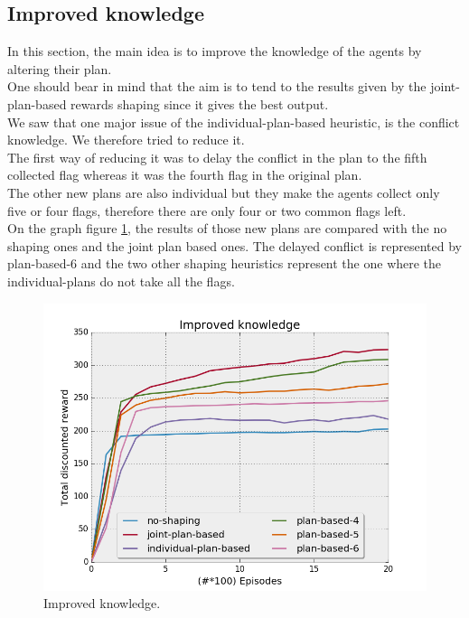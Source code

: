 \documentclass[letterpaper]{article}
\begin{document}
\subsection{Improved knowledge}

In this section, the main idea is to improve the knowledge of the agents by altering their plan.\\
One should bear in mind that the aim is to tend to the results given by the joint-plan-based rewards shaping since it gives the best output.\\
We saw that one major issue of the individual-plan-based heuristic, is the conflict knowledge. We therefore tried to reduce it.\\
The first way of reducing it was to delay the conflict in the plan to the fifth collected flag whereas it was the fourth flag in the original plan.\\
The other new plans are also individual but they make the agents collect only five or four flags, therefore there are only four or two common flags left.\\
On the graph figure \ref{fig:results2}, the results of those new plans are compared with the no shaping ones and the joint plan based ones. The delayed conflict is represented by plan-based-6 and the two other shaping heuristics represent the one where the individual-plans do not take all the flags.

\begin{figure}[h!]
  \includegraphics[width=\linewidth]{img/knowledge.png}
  \caption{Improved knowledge.}
  \label{fig:results2}
\end{figure}
\end{document}
